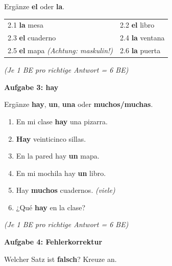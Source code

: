 \documentclass[11pt,a4paper]{article}
\newcommand{\lsg}[1]{\textcolor{loesung}{\textbf{#1}}}
\newcommand{\punktebox}[1]{\hfill\fbox{\small \_/#1}}
\begin{document}
\noindent Ergänze \textbf{el} oder \textbf{la}.

\vspace{0.3cm}

\begin{tabular}{p{6cm}p{6cm}}
2.1 \lsg{la} mesa & 2.2 \lsg{el} libro \\[0.8em]
2.3 \lsg{el} cuaderno & 2.4 \lsg{la} ventana \\[0.8em]
2.5 \lsg{el} mapa \textit{(Achtung: maskulin!)} & 2.6 \lsg{la} puerta \\
\end{tabular}

\textcolor{loesung}{\textit{(Je 1 BE pro richtige Antwort = 6 BE)}}

\vspace{0.8cm}

\noindent\textbf{Aufgabe 3: hay} \punktebox{6}

\noindent Ergänze \textbf{hay}, \textbf{un}, \textbf{una} oder \textbf{muchos/muchas}.

\vspace{0.3cm}

\begin{enumerate}[label=3.\arabic*]
    \item En mi clase \lsg{hay} una pizarra.
    \item \lsg{Hay} veinticinco sillas.
    \item En la pared hay \lsg{un} mapa.
    \item En mi mochila hay \lsg{un} libro.
    \item Hay \lsg{muchos} cuadernos. \textit{(viele)}
    \item ¿Qué \lsg{hay} en la clase?
\end{enumerate}

\textcolor{loesung}{\textit{(Je 1 BE pro richtige Antwort = 6 BE)}}

\vspace{0.8cm}

\noindent\textbf{Aufgabe 4: Fehlerkorrektur} \punktebox{5}

\noindent Welcher Satz ist \textbf{falsch}? Kreuze an.
\end{document}

